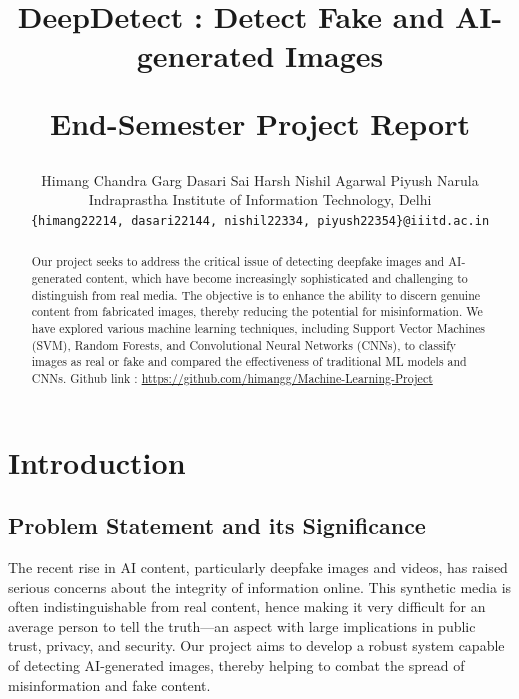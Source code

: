 \documentclass[10pt,twocolumn,letterpaper]{article}
\begin{document}
\title{\begin{center}
    \vspace{-1.75cm}
    DeepDetect : Detect Fake and AI-generated Images
\end{center}
End-Semester Project Report}

\author{Himang Chandra Garg \qquad Dasari Sai Harsh \qquad Nishil Agarwal \qquad Piyush Narula\\
Indraprastha Institute of Information Technology, Delhi\\
{\tt\small \{himang22214, dasari22144, nishil22334, piyush22354\}@iiitd.ac.in}
}

\maketitle

\pagestyle{empty}


\begin{abstract}

Our project seeks to address the critical issue of detecting deepfake images and AI-generated content, which have become increasingly sophisticated and challenging to distinguish from real media. 
The objective is to enhance the ability to discern genuine content from fabricated images, thereby reducing the potential for misinformation.
We have explored various machine learning techniques, including Support Vector Machines (SVM), Random Forests, and Convolutional Neural Networks (CNNs), to classify images as real or fake and compared the effectiveness of traditional ML models and CNNs.
Github link : \url{https://github.com/himangg/Machine-Learning-Project}
\end{abstract}

\vspace{-5pt}
\section{Introduction}
\subsection{Problem Statement and its Significance}

The recent rise in AI content, particularly deepfake images and videos, has raised serious concerns about the integrity of information online. 
This synthetic media is often indistinguishable from real content, hence making it very difficult for an average person to tell the truth—an aspect with large implications in public trust, privacy, and security.
Our project aims to develop a robust system capable of detecting AI-generated images, thereby helping to combat the spread of misinformation and fake content.
\end{document}
